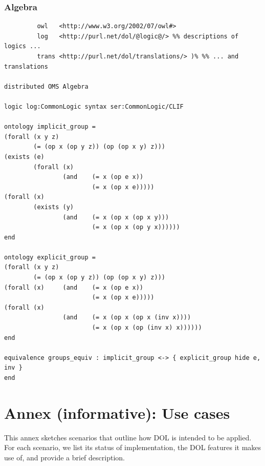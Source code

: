 \documentclass[10pt,%
\ifpretendfinal
final%
\else
draft%
\fi,
]{scrreprt}
\newcommand{\ssclause}[1]{\subsection{#1}}
\newcommand{\infannex}[1]{ \chapter{Annex (informative): #1} }
\begin{document}
\ssclause{Algebra}

\begin{lstlisting}[basicstyle=\ttfamily,language=dolText,morekeywords={props,ObjectProperty,Class,DisjointUnionOf,SubClassOf,Characteristics,Transitive,Asymmetric,SubPropertyOf,DisjointClasses,EquivalentTo,inverse,only,forall,iff,if,or,exists,bridge,distributed},escapechar=@,mathescape]
%prefix( :     <http://www.example.org/alignment#>
         owl   <http://www.w3.org/2002/07/owl#>
         log   <http://purl.net/dol/@logic@/> %% descriptions of logics ...
         trans <http://purl.net/dol/translations/> )% %% ... and translations

distributed OMS Algebra

logic log:CommonLogic syntax ser:CommonLogic/CLIF

ontology implicit_group =
(forall (x y z)
        (= (op x (op y z)) (op (op x y) z)))
(exists (e)
        (forall (x)
                (and    (= x (op e x))
                        (= x (op x e)))))
(forall (x)
        (exists (y)
                (and    (= x (op x (op x y)))
                        (= x (op x (op y x))))))
end

ontology explicit_group =
(forall (x y z)
        (= (op x (op y z)) (op (op x y) z)))
(forall (x)     (and    (= x (op e x))
                        (= x (op x e)))))
(forall (x)
                (and    (= x (op x (op x (inv x))))
                        (= x (op x (op (inv x) x))))))
end

equivalence groups_equiv : implicit_group <-> { explicit_group hide e, inv }
end

\end{lstlisting}

\infannex{Use cases}

This annex sketches scenarios that outline how DOL is intended to be applied.  For each scenario, we list its status of implementation, the DOL features it makes use of, and provide a brief description.
\end{document}
